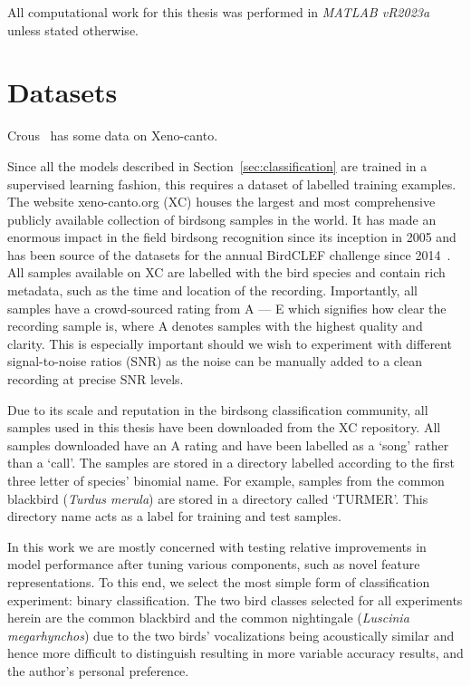 All computational work for this thesis was performed in \textit{MATLAB vR2023a}
unless stated otherwise.

\section{Datasets}

Crous~\cite{crous2019polyphonic} has some data on Xeno-canto.

Since all the models described in Section~\ref{sec:classification} are trained
in a supervised learning fashion, this requires a dataset of labelled training
examples. The website xeno-canto.org (XC) houses the largest and most
comprehensive publicly available collection of birdsong samples in the world. It
has made an enormous impact in the field birdsong recognition since its
inception in 2005 and has been source of the datasets for the annual BirdCLEF
challenge since 2014~\cite{vellinga2015xeno}. All samples available on XC are
labelled with the bird species and contain rich metadata, such as the time and
location of the recording. Importantly, all samples have a crowd-sourced rating
from A --- E which signifies how clear the recording sample is, where A denotes
samples with the highest quality and clarity. This is especially important
should we wish to experiment with different signal-to-noise ratios (SNR) as the
noise can be manually added to a clean recording at precise SNR levels.

Due to its scale and reputation in the birdsong classification community, all
samples used in this thesis have been downloaded from the XC repository. All
samples downloaded have an A rating and have been labelled as a `song' rather
than a `call'. The samples are stored in a directory labelled according to the
first three letter of species' binomial name. For example, samples from the
common blackbird (\textit{Turdus merula}) are stored in a directory called
`TURMER'. This directory name acts as a label for training and test samples.

In this work we are mostly concerned with testing relative improvements in model
performance after tuning various components, such as novel feature
representations. To this end, we select the most simple form of classification
experiment: binary classification. The two bird classes selected for all
experiments herein are the common blackbird and the common nightingale
(\textit{Luscinia megarhynchos}) due to the two birds' vocalizations being
acoustically similar and hence more difficult to distinguish resulting in more
variable accuracy results, and the author's personal preference.

